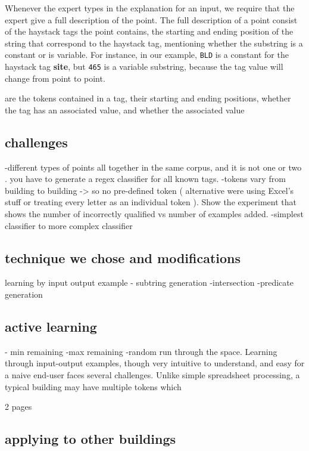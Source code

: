 Whenever the expert types in the explanation for an input, we require that the expert give a full description of the point. The full description of a point consist of the haystack tags the point contains, the starting and ending position of the string that correspond to the haystack tag, mentioning whether the substring is a constant or is variable. For instance, in our example, {\tt BLD} is a constant for the haystack tag {\bf site}, but {\tt 465} is a variable substring, because the tag value will change from point to point. 


are the tokens contained in a tag, their starting and ending positions, whether the tag has an associated value, and whether the associated value 

\subsection{challenges}


-different types of points all together in the same corpus, and it is not one or two . you have to generate a regex classifier for all known tags. 
-tokens vary from building to building -> so no pre-defined token ( alternative were using Excel's stuff or treating every letter as an individual token ). Show the experiment that shows the number of incorrectly qualified vs number of examples added.
-simplest classifier to more complex classifier



\subsection{technique we chose and modifications}

learning by input output example
- subtring generation
-intersection
-predicate generation


\subsection{active learning}

- min remaining
-max remaining 
-random run through the space.
Learning through input-output examples, though very intuitive to understand, and easy for a naive end-user faces several challenges. Unlike simple spreadsheet processing, a typical building may have multiple tokens  which 



2 pages




\subsection{applying to other buildings}







